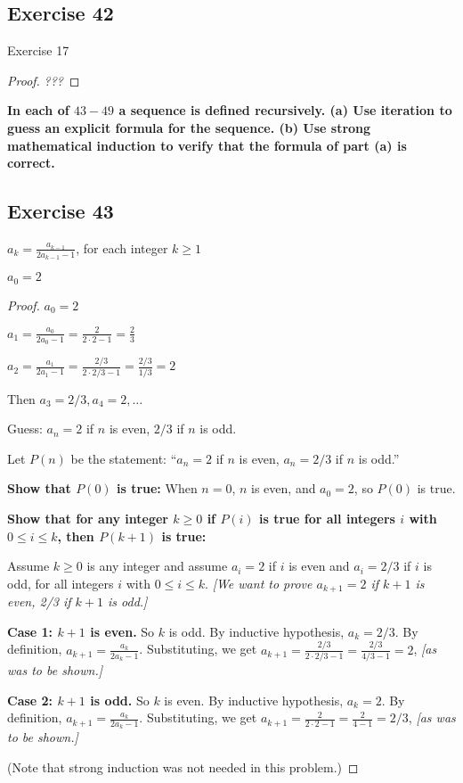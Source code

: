 \documentclass[14pt]{extarticle}
\newcommand{\dps}{\displaystyle}
\newcommand{\cy}{\color{cyan}}
\begin{document}
\subsection{Exercise 42}
Exercise 17

\begin{proof}
    {\it ???}
\end{proof}

{\bf \cy In each of $43-49$ a sequence is defined recursively. (a) Use iteration to guess an explicit formula
for the sequence. (b) Use strong mathematical induction to verify that the formula of part (a) is correct.}

\subsection{Exercise 43}
\(a_k = \dps \frac{a_{k-1}}{2a_{k-1}-1}\), for each integer \(k \geq 1\)

\(a_0 = 2\)

\begin{proof}
    \(a_0 = 2\)

    \(a_1 = \dps \frac{a_0}{2a_0-1} = \frac{2}{2 \cdot 2 -1} = \frac{2}{3}\)

    \(a_2 = \dps \frac{a_1}{2a_1-1} = \frac{2/3}{2 \cdot 2/3 -1} = \frac{2/3}{1/3} = 2\)

    Then \(a_3 = 2/3, a_4 = 2, \ldots\)

    Guess: \(a_n = 2\) if $n$ is even, $2/3$ if $n$ is odd.

    Let $P(n)$ be the statement: ``\(a_n = 2\) if $n$ is even, \(a_n = 2/3\) if $n$ is odd.''

    {\bf Show that $P(0)$ is true:} When $n = 0$, $n$ is even, and $a_0 = 2$, so $P(0)$ is true.

        {\bf Show that for any integer \(k \geq 0\) if $P(i)$ is true for all integers $i$ with \(0 \leq i \leq k\), then
            $P(k+1)$ is true:}

    Assume \(k \geq 0\) is any integer and assume \(a_i = 2\) if $i$ is even and \(a_i = 2/3\) if $i$ is odd,
    for all integers $i$ with \(0 \leq i \leq k\). {\it [We want to prove \(a_{k+1} = 2\) if $k+1$ is even, 2/3 if
                $k+1$ is odd.]}

        {\bf Case 1: $k+1$ is even.} So $k$ is odd. By inductive hypothesis, \(a_k = 2/3\).
    By definition, \(a_{k+1} = \dps \frac{a_k}{2a_k-1}\).
    Substituting, we get \(a_{k+1} = \dps \frac{2/3}{2 \cdot 2/3 -1} = \frac{2/3}{4/3 - 1} = 2\), {\it [as was to be shown.]}

        {\bf Case 2: $k+1$ is odd.} So $k$ is even. By inductive hypothesis, \(a_k = 2\).
    By definition, \(a_{k+1} = \dps \frac{a_k}{2a_k-1}\).
    Substituting, we get \(a_{k+1} = \dps \frac{2}{2 \cdot 2 -1} = \frac{2}{4 - 1} = 2/3\), {\it [as was to be shown.]}

    (Note that strong induction was not needed in this problem.)
\end{proof}
\end{document}
